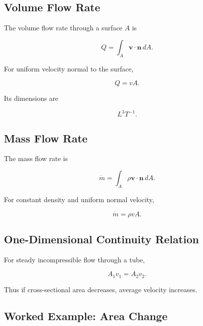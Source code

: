 \subsection{Volume Flow Rate}
\label{subsec:volume-flow-rate}

The volume flow rate through a surface \(A\) is

\[
\boxed{
Q
=
\int_A
\mathbf{v}\cdot\mathbf{n}\,dA.
}
\]

For uniform velocity normal to the surface,

\[
\boxed{
Q
=
vA.
}
\]

Its dimensions are

\[
\boxed{
L^3T^{-1}.
}
\]

\subsection{Mass Flow Rate}
\label{subsec:mass-flow-rate}

The mass flow rate is

\[
\boxed{
\dot m
=
\int_A
\rho
\mathbf{v}\cdot\mathbf{n}
\,dA.
}
\]

For constant density and uniform normal velocity,

\[
\boxed{
\dot m
=
\rho vA.
}
\]

\subsection{One-Dimensional Continuity Relation}
\label{subsec:one-dimensional-continuity}

For steady incompressible flow through a tube,

\[
\boxed{
A_1v_1
=
A_2v_2.
}
\]

Thus if cross-sectional area decreases, average velocity increases.

\subsection{Worked Example: Area Change}
\label{subsec:worked-area-change}

